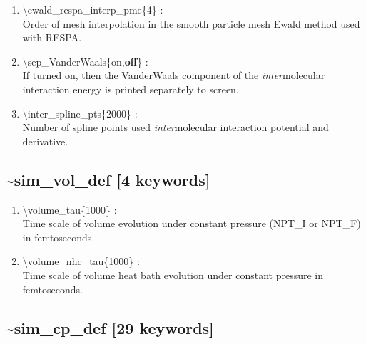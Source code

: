 \documentclass[12pt,titlepage]{article}
\begin{document}
\begin{enumerate}
 \vspace{0.15in} 
 \item   \textbackslash{}ewald\_respa\_interp\_pme\{4\} : \\
  Order of mesh interpolation in the smooth particle mesh Ewald method used
  with RESPA.

 \vspace{0.15in}
 \item   \textbackslash{}sep\_VanderWaals\{on,{\bf off}\} : \\
   If turned on, then the VanderWaals component of the {\it inter}molecular 
   interaction energy is printed separately to screen.

 \vspace{0.15in} 
 \item   \textbackslash{}inter\_spline\_pts\{2000\} : \\
    Number of spline points used {\it inter}molecular interaction 
    potential and derivative.

\end{enumerate}

\newpage
\subsection*{\bf \~{}sim\_vol\_def [4 keywords]}

\begin{enumerate}

 \vspace{0.15in} 
 \item  \textbackslash{}volume\_tau\{1000\} : \\
     Time scale of volume evolution
     under constant pressure (NPT\_I or NPT\_F) in femtoseconds.
  
 \vspace{0.15in} 
 \item  \textbackslash{}volume\_nhc\_tau\{1000\} : \\
     Time scale of volume 
     heat bath evolution under constant pressure in femtoseconds.

\end{enumerate}

\newpage
\subsection*{\bf \~{}sim\_cp\_def [29 keywords]}
\end{document}
